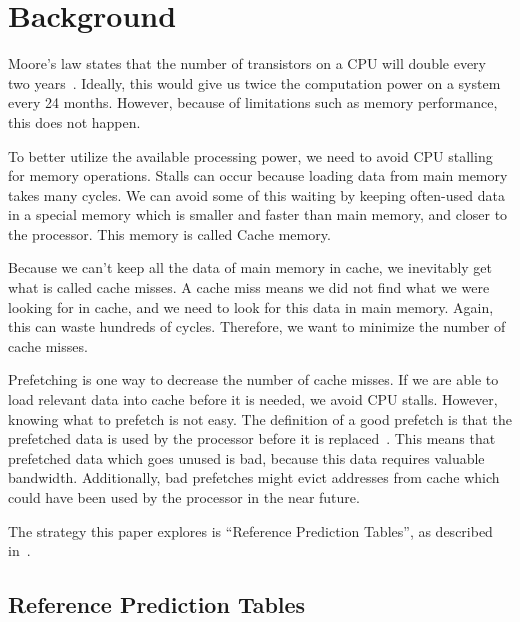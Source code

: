 \section{Background} %


Moore's law states that the number of transistors on a CPU will double
every two years~\cite{moore}. Ideally, this would give us twice the
computation power on a system every 24 months. However, because of
limitations such as memory performance, this does not happen.

To better utilize the available processing power, we need to avoid CPU
stalling for memory operations. Stalls can occur because loading data
from main memory takes many cycles. We can avoid some of this waiting
by keeping often-used data in a special memory which is smaller and
faster than main memory, and closer to the processor. This memory is
called Cache memory.

Because we can't keep all the data of main memory in cache, we
inevitably get what is called cache misses. A cache miss means we did
not find what we were looking for in cache, and we need to look for
this data in main memory. Again, this can waste hundreds of
cycles. Therefore, we want to minimize the number of cache misses.

Prefetching is one way to decrease the number of cache misses. If we
are able to load relevant data into cache before it is needed, we
avoid CPU stalls. However, knowing what to prefetch is not easy. The
definition of a good prefetch is that the prefetched data is used by
the processor before it is
replaced~\cite{srinivasan_davidson_tyson_2004}. This means that
prefetched data which goes unused is bad, because this data requires
valuable bandwidth. Additionally, bad prefetches might evict addresses
from cache which could have been used by the processor in the near
future.

The strategy this paper explores is ``Reference Prediction Tables'', as
described in~\cite{chen_baer_1995}.

\subsection{Reference Prediction Tables}
